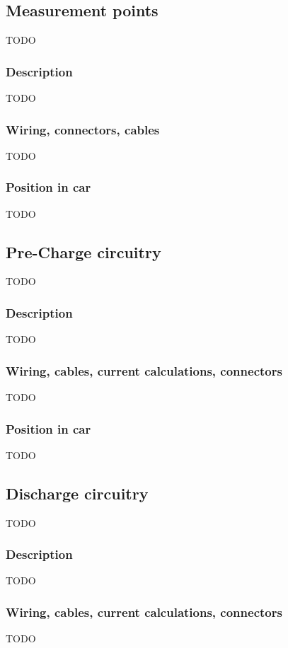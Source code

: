 \documentclass{article}
\begin{document}
\subsection{Measurement points}
TODO

\subsubsection{Description}
TODO

\subsubsection{Wiring, connectors, cables}
TODO

\subsubsection{Position in car}
TODO

\subsection{Pre-Charge circuitry}
TODO

\subsubsection{Description}
TODO

\subsubsection{Wiring, cables, current calculations, connectors}
TODO

\subsubsection{Position in car}
TODO

\subsection{Discharge circuitry}
TODO

\subsubsection{Description}
TODO

\subsubsection{Wiring, cables, current calculations, connectors}
TODO
\end{document}
